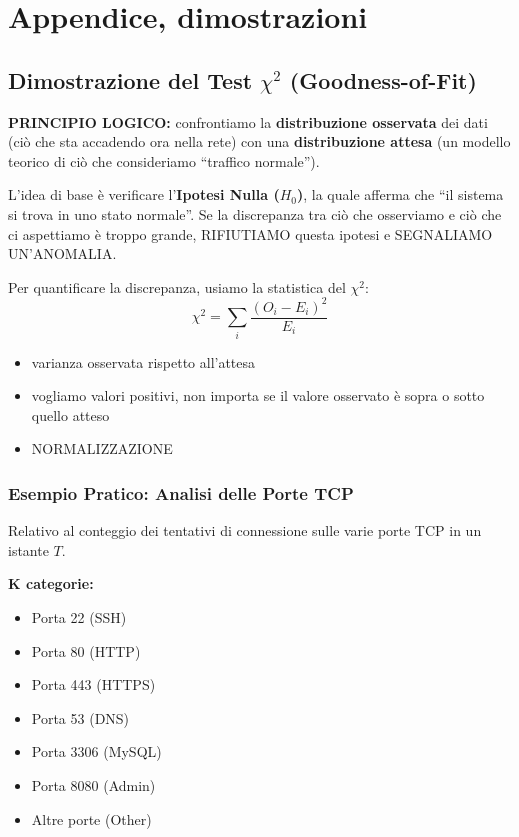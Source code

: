 \section{Appendice, dimostrazioni}

\subsection{Dimostrazione del Test $\chi^2$ (Goodness-of-Fit)}

\textbf{PRINCIPIO LOGICO:} confrontiamo la \textbf{distribuzione
osservata} dei dati (ciò che sta accadendo ora nella rete) con
una \textbf{distribuzione attesa} (un modello teorico di ciò che
consideriamo ``traffico normale'').

L'idea di base è verificare l'\textbf{Ipotesi Nulla ($H_0$)},
la quale afferma che ``il sistema si trova in uno stato normale''.
Se la discrepanza tra ciò che osserviamo e ciò che ci aspettiamo
è troppo grande, RIFIUTIAMO questa ipotesi e SEGNALIAMO
UN'ANOMALIA.

Per quantificare la discrepanza, usiamo la statistica del
$\chi^2$:
\[
    \chi^2 = \sum_{i} \frac{(O_i - E_i)^2}{E_i}
\]
\begin{itemize}
    \item varianza osservata rispetto all'attesa
    \item vogliamo valori positivi, non importa se il valore
          osservato è sopra o sotto quello atteso
    \item NORMALIZZAZIONE
\end{itemize}

\subsubsection{Esempio Pratico: Analisi delle Porte TCP}

Relativo al conteggio dei tentativi di connessione sulle varie
porte TCP in un istante $T$.

\textbf{K categorie:}
\begin{itemize}
    \item Porta 22 (SSH)
    \item Porta 80 (HTTP)
    \item Porta 443 (HTTPS)
    \item Porta 53 (DNS)
    \item Porta 3306 (MySQL)
    \item Porta 8080 (Admin)
    \item Altre porte (Other)
\end{itemize}

